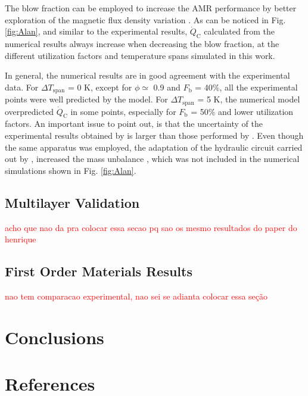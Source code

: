 \documentclass[review,preprint,12pt]{elsarticle}
\begin{document}
The blow fraction can be employed to increase the AMR performance by better exploration of the magnetic flux density variation \cite{Teyber2016,Nakashima2017}. As can be noticed in Fig. \ref{fig:Alan}, and similar to the experimental results, $\dot{Q}_\textrm{C}$ calculated from the numerical results always increase when decreasing the blow fraction, at the different utilization factors and temperature spans simulated in this work. 

In general, the numerical results are in good agreement with the experimental data. For $\Delta T_\textrm{span}$ = 0 K, except for $\phi \simeq$  0.9 and $F_\textrm{b}$ = 40\%, all the experimental points were well predicted by the model. For $\Delta T_\textrm{span}$ = 5 K, the numerical model overpredicted $\dot{Q}_\textrm{C}$ in some points, especially for $F_\textrm{b}$ = 50\% and lower utilization factors. An important issue to point out, is that the uncertainty of the experimental results obtained by \cite{Nakashima2017} is larger than those performed by \cite{Trevizoli2015}. Even though the same apparatus was employed, the adaptation of the hydraulic circuit carried out by \cite{Nakashima2017}, increased the mass unbalance \cite{EriksenPHD,Nakashima2017}, which was not included in the numerical simulations shown in Fig. \ref{fig:Alan}.


\subsection{Multilayer Validation}

\textcolor{red}{acho que nao da pra colocar essa secao pq sao os mesmo resultados do paper do henrique}



\subsection{First Order Materials Results}

\textcolor{red}{nao tem comparacao experimental, nao sei se adianta colocar essa seção}

\section{Conclusions}


\section*{References}





\end{document}

